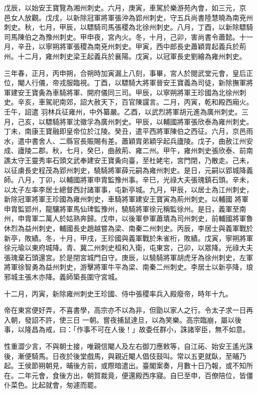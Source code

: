 \begin{pinyinscope}
 戊辰，以始安王寶覽為湘州刺史。六月，庚寅，車駕於樂游苑內會，如三元，京
 邑女人放觀。戊戌，以新除冠軍將軍張沖為郢州刺史，守五兵尚書陸慧曉為南兗州刺史。秋，七月，甲辰，以驃騎司馬張稷為北徐州刺史。八月，丁酉，以新除驃騎司馬陳伯之為豫州刺史。甲申夜，宮內火。冬，十月，己卯，害尚書令蕭懿。十一月，辛丑，以寧朔將軍張稷為南兗州刺史。甲寅，西中郎長史蕭穎胄起義兵於荊州。十二月，雍州刺史梁王起義兵於襄陽。戊寅，以冠軍長史劉繪為雍州刺史。



 三年春，正月，丙申朔，合朔時加寅漏上八刻，事畢，宮人於閱武堂元會，皇后正位，閹人行儀，帝戎服臨視。丁酉，以驃騎大將軍晉安王寶義為司徒，新除撫軍將軍建安王寶夤為車騎將軍、開府儀同三司。甲辰，以寧朔將軍王珍國為北徐州刺史。辛亥，車駕祀南郊，詔大赦天下，百官陳讜言。二月，丙寅，乾和殿西廂火。壬午，詔遣
 羽林兵征雍州，中外纂嚴。乙酉，以武烈將軍胡元進為廣州刺史。三月，己亥，以驃騎將軍沈徽孚為廣州刺史。甲辰，以輔國將軍張欣泰為雍州刺史。丁未，南康王寶融即皇帝位於江陵。癸丑，遣平西將軍陳伯之西征。六月，京邑雨水，遣中書舍人、二縣官長賑賜有差。蕭穎胄弟穎孚起兵廬陵。戊子，曲赦江州安成、廬陵二郡。秋，七月，癸巳，曲赦荊、雍二州。甲午，雍州刺史張欣泰、前南譙太守王靈秀率石頭文武奉建安王寶夤向臺，至杜姥宅，宮門閉，乃散走。己未，以征虜長史程茂為郢州刺史，驍騎將軍薛元嗣為雍州刺史。是日，元嗣以郢城降義師。八月，丁卯，以輔國將軍申胄監豫州事。辛巳，光祿大夫張瑰鎮石頭。辛未，以太子左率李居士總督西討諸軍事，屯新亭城。九月，甲辰，以居士為江州刺史，新除冠軍將軍王珍國為雍州刺史，車騎將軍建安王寶寅為荊州刺史。以輔國
 將軍申胄監郢州，龍驤將軍馬仙琕監豫州，驍騎將軍徐元稱監徐州。是日，義軍至南州，申胄軍二萬人於姑熟奔歸。戊申，以後軍參軍蕭璝為司州刺史，前輔國將軍魯休烈為益州刺史，輔國長史趙越嘗為梁、南秦二州刺史。丙辰，李居士與義軍戰於新亭，敗績。冬，十月，甲戌，王珍國與義軍戰於朱雀桁，敗績。戊寅，寧朔將軍徐元瑜以東府城降。青、冀二州刺史桓和入衛，屯東宮，己卯，以眾降。光祿大夫張瑰棄石頭還宮。於是閉宮城門自守。庚辰，以驍騎將軍胡虎牙為徐州刺史，左軍將軍徐智勇為益州刺史，游擊將軍牛平為梁、南秦二州刺史。李居士以新亭降，琅邪城主張木亦降。義師築長圍守宮城。



 十二月，丙寅，新除雍州刺史王珍國、侍中張稷率兵入殿廢帝，時年十九。



 帝在東宮便好弄，不喜書學，高宗亦不以為非，但勖以家人之行。令太子求一日再入朝，發詔不許，使三日
 一朝。嘗夜捕鼠達旦，以為笑樂。高宗臨崩，屬以後事，以隆昌為戒，曰：「作事不可在人後！」故委任群小，誅諸宰臣，無不如意。



 性重澀少言，不與朝士接，唯親信閹人及左右御刀應敕等，自江祏、始安王遙光誅後，漸便騎馬。日夜於後堂戲馬，與親近閹人倡伎鼓叫。常以五更就臥，至晡乃起。王侯節朔朝見，晡後方前，或際暗遣出。臺閣案奏，月數十日乃報，或不知所在。二年元會，食後方出，朝賀裁竟，便還殿西序寢。自巳至申，百僚陪位，皆僵仆菜色。比起就會，匆遽而罷。




\end{pinyinscope}
